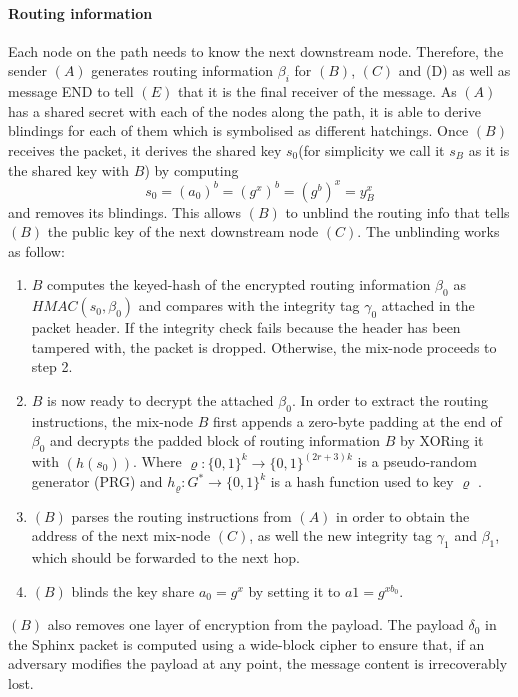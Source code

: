 \paragraph{Routing information}
Each node on the path needs to know the next downstream node. Therefore, the sender $(A)$ generates routing information $\beta_i$ for $(B)$, $(C)$ and (D) as well as message END to tell $(E)$ that it is the final receiver of the message. 
\newline As $(A)$ has a shared secret with each of the nodes along the path, it is able to derive blindings for each of them which is symbolised as different hatchings.
\newline Once $(B)$ receives the packet, it derives the shared key $s_0$(for simplicity we call it $s_B$ as it is the shared key with $B$) by computing
$$s_0=(a_0)^b=(g^x)^b=(g^b)^x=y^x_B$$ and removes its blindings. This allows $(B)$ to unblind the routing info that tells $(B)$ the public key of the next downstream node $(C)$.
The unblinding works as follow:
\begin{enumerate}
    \item $B$ computes the keyed-hash of the encrypted routing information $\beta_0$ as $HMAC(s_0,\beta_0)$ and compares with the integrity tag $\gamma_0$ attached in the packet header. If the integrity check fails because the header has been tampered with, the packet is dropped. Otherwise, the mix-node proceeds to step 2.
    \item $B$ is now ready to decrypt the attached $\beta_0$. In order to extract the routing instructions, the mix-node $B$ first appends a zero-byte padding at the end of $\beta_0$ and decrypts the padded block of routing information $B$ by XORing it with $(h(s_0))$. Where $\varrho :\{0,1\}^k\rightarrow \{0,1\}^{(2r+3)k}$ is a pseudo-random generator (PRG) and $h_\varrho:G^*\rightarrow \{0,1\}^k$ is a hash function used to key $\varrho$ . 
    \item $(B)$ parses the routing instructions from $(A)$ in order to obtain the address of the next mix-node $(C)$, as well the new integrity tag $\gamma_1$ and $\beta_1$, which should be forwarded to the next hop.
    \item $(B)$ blinds the key share $a_0=g^x$ by setting it to $a1=g^{xb_0}$.
\end{enumerate}
$(B)$ also removes one layer of encryption from the payload.
The payload $\delta_0$ in the Sphinx packet is computed using a wide-block cipher to ensure that, if an adversary modifies the payload at any point, the message content is irrecoverably lost.
